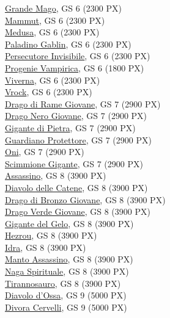 \begin{multicols}{3}
{\hyperlink{Grande Mago}{Grande Mago}, GS 6 (2300 PX)\\
\hyperlink{Mammut}{Mammut}, GS 6 (2300 PX)\\
\hyperlink{Medusa}{Medusa}, GS 6 (2300 PX)\\
\hyperlink{Paladino Gablin}{Paladino Gablin}, GS 6 (2300 PX)\\
\hyperlink{Persecutore Invisibile}{Persecutore Invisibile}, GS 6 (2300 PX)\\
\hyperlink{Progenie Vampirica}{Progenie Vampirica}, GS 6 (1800 PX)\\
\hyperlink{Viverna}{Viverna}, GS 6 (2300 PX)\\
\hyperlink{Vrock}{Vrock}, GS 6 (2300 PX)\\
\hyperlink{Drago di Rame Giovane}{Drago di Rame Giovane}, GS 7 (2900 PX)\\
\hyperlink{Drago Nero Giovane}{Drago Nero Giovane}, GS 7 (2900 PX)\\
\hyperlink{Gigante di Pietra}{Gigante di Pietra}, GS 7 (2900 PX)\\
\hyperlink{Guardiano Protettore}{Guardiano Protettore}, GS 7 (2900 PX)\\
\hyperlink{Oni}{Oni}, GS 7 (2900 PX)\\
\hyperlink{Scimmione Gigante}{Scimmione Gigante}, GS 7 (2900 PX)\\
\hyperlink{Assassino}{Assassino}, GS 8 (3900 PX)\\
\hyperlink{Diavolo delle Catene}{Diavolo delle Catene}, GS 8 (3900 PX)\\
\hyperlink{Drago di Bronzo Giovane}{Drago di Bronzo Giovane}, GS 8 (3900 PX)\\
\hyperlink{Drago Verde Giovane}{Drago Verde Giovane}, GS 8 (3900 PX)\\
\hyperlink{Gigante del Gelo}{Gigante del Gelo}, GS 8 (3900 PX)\\
\hyperlink{Hezrou}{Hezrou}, GS 8 (3900 PX)\\
\hyperlink{Idra}{Idra}, GS 8 (3900 PX)\\
\hyperlink{Manto Assassino}{Manto Assassino}, GS 8 (3900 PX)\\
\hyperlink{Naga Spirituale}{Naga Spirituale}, GS 8 (3900 PX)\\
\hyperlink{Tirannosauro}{Tirannosauro}, GS 8 (3900 PX)\\
\hyperlink{Diavolo d'Ossa}{Diavolo d'Ossa}, GS 9 (5000 PX)\\
\hyperlink{Divora Cervelli}{Divora Cervelli}, GS 9 (5000 PX)\\
}
\end{multicols}

